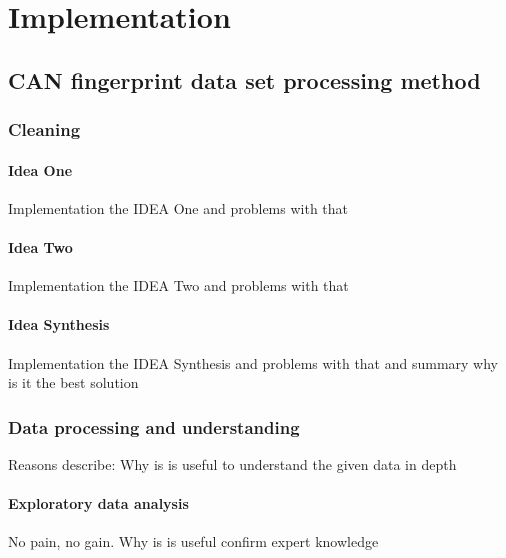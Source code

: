 \chapter{Implementation}
\section{CAN fingerprint data set processing method}
\subsection{Cleaning}
		\subsubsection{Idea One}
		Implementation the IDEA One and problems with that
		\subsubsection{Idea Two}
		Implementation the IDEA Two and problems with that
		\subsubsection{Idea Synthesis}
		Implementation the IDEA Synthesis and problems with that and summary why is it the best solution
\subsection{Data processing and understanding}
		Reasons describe: Why is is useful to understand the given data in depth
	\subsubsection{Exploratory data analysis}
		No pain, no gain. Why is is useful
		confirm expert knowledge
